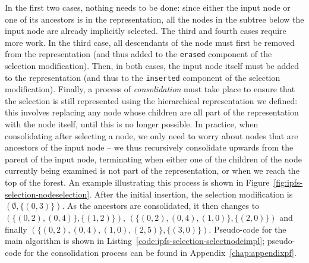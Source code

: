 \noindent In the first two cases, nothing needs to be done: since either the input node or one of its ancestors is in the representation, all the nodes in the subtree below the input node are already implicitly selected. The third and fourth cases require more work. In the third case, all descendants of the node must first be removed from the representation (and thus added to the \texttt{erased} component of the selection modification). Then, in both cases, the input node itself must be added to the representation (and thus to the \texttt{inserted} component of the selection modification). Finally, a process of \emph{consolidation} must take place to ensure that the selection is still represented using the hierarchical representation we defined: this involves replacing any node whose children are all part of the representation with the node itself, until this is no longer possible. In practice, when consolidating after selecting a node, we only need to worry about nodes that are ancestors of the input node -- we thus recursively consolidate upwards from the parent of the input node, terminating when either one of the children of the node currently being examined is not part of the representation, or when we reach the top of the forest. An example illustrating this process is shown in Figure~\ref{fig:ipfs-selection-nodeselection}. After the initial insertion, the selection modification is $(\emptyset,\{(0,3)\})$. As the ancestors are consolidated, it then changes to $(\{(0,2), (0,4)\}, \{(1,2)\})$, $(\{(0,2), (0,4), (1,0)\}, \{(2,0)\})$ and finally $(\{(0,2), (0,4), (1,0), (2,5)\}, \{(3,0)\})$. Pseudo-code for the main algorithm is shown in Listing~\ref{code:ipfs-selection-selectnodeimpl}; pseudo-code for the consolidation process can be found in Appendix~\ref{chap:appendixpf}.


